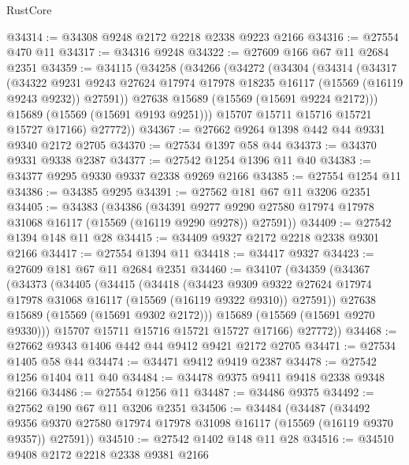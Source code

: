 \begin{lexlean}{RustCore}
\begin{coremodule}
@34314 := @34308 @9248 @2172 @2218 @2338 @9223 @2166
@34316 := @27554 @470 @11
@34317 := @34316 @9248
@34322 := @27609 @166 @67 @11 @2684 @2351
@34359 := @34115
    (@34258
      (@34266
        (@34272
          (@34304
            (@34314
              (@34317
                (@34322
                  @9231
                  @9243
                  @27624
                  @17974
                  @17978
                  @18235
                  @16117
                  (@15569 (@16119 @9243 @9232))
                  @27591))
              @27638
              @15689
              (@15569 (@15691 @9224 @2172)))
            @15689
            (@15569 (@15691 @9193 @9251)))
          @15707
          @15711
          @15716
          @15721
          @15727
          @17166)
        @27772))
@34367 := @27662 @9264 @1398 @442 @44 @9331 @9340 @2172 @2705
@34370 := @27534 @1397 @58 @44
@34373 := @34370 @9331 @9338 @2387
@34377 := @27542 @1254 @1396 @11 @40
@34383 := @34377 @9295 @9330 @9337 @2338 @9269 @2166
@34385 := @27554 @1254 @11
@34386 := @34385 @9295
@34391 := @27562 @181 @67 @11 @3206 @2351
@34405 := @34383
    (@34386
      (@34391 @9277 @9290 @27580 @17974 @17978 @31068 @16117 (@15569 (@16119 @9290 @9278)) @27591))
@34409 := @27542 @1394 @148 @11 @28
@34415 := @34409 @9327 @2172 @2218 @2338 @9301 @2166
@34417 := @27554 @1394 @11
@34418 := @34417 @9327
@34423 := @27609 @181 @67 @11 @2684 @2351
@34460 := @34107
    (@34359
      (@34367
        (@34373
          (@34405
            (@34415
              (@34418
                (@34423
                  @9309
                  @9322
                  @27624
                  @17974
                  @17978
                  @31068
                  @16117
                  (@15569 (@16119 @9322 @9310))
                  @27591))
              @27638
              @15689
              (@15569 (@15691 @9302 @2172)))
            @15689
            (@15569 (@15691 @9270 @9330)))
          @15707
          @15711
          @15716
          @15721
          @15727
          @17166)
        @27772))
@34468 := @27662 @9343 @1406 @442 @44 @9412 @9421 @2172 @2705
@34471 := @27534 @1405 @58 @44
@34474 := @34471 @9412 @9419 @2387
@34478 := @27542 @1256 @1404 @11 @40
@34484 := @34478 @9375 @9411 @9418 @2338 @9348 @2166
@34486 := @27554 @1256 @11
@34487 := @34486 @9375
@34492 := @27562 @190 @67 @11 @3206 @2351
@34506 := @34484
    (@34487
      (@34492 @9356 @9370 @27580 @17974 @17978 @31098 @16117 (@15569 (@16119 @9370 @9357)) @27591))
@34510 := @27542 @1402 @148 @11 @28
@34516 := @34510 @9408 @2172 @2218 @2338 @9381 @2166

\end{coremodule}
\end{lexlean}
